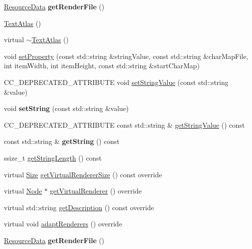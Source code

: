 \begin{DoxyCompactItemize}
\item 
\mbox{\label{classui_1_1TextAtlas_ad62a4335155276f3e2dc795180cff3d1}} 
\hyperlink{structResourceData}{Resource\+Data} {\bfseries get\+Render\+File} ()
\item 
\hyperlink{classui_1_1TextAtlas_a10e8abf999ff03704e3d8ba2f44487d2}{Text\+Atlas} ()
\item 
virtual \hyperlink{classui_1_1TextAtlas_a09278347c272a0c38b95f4a48cc35817}{$\sim$\+Text\+Atlas} ()
\item 
void \hyperlink{classui_1_1TextAtlas_a7d6ab98bd8279a893f304205964401dd}{set\+Property} (const std\+::string \&string\+Value, const std\+::string \&char\+Map\+File, int item\+Width, int item\+Height, const std\+::string \&start\+Char\+Map)
\item 
C\+C\+\_\+\+D\+E\+P\+R\+E\+C\+A\+T\+E\+D\+\_\+\+A\+T\+T\+R\+I\+B\+U\+TE void \hyperlink{classui_1_1TextAtlas_af0f33051246221a59b0127462f5b9ab4}{set\+String\+Value} (const std\+::string \&value)
\item 
\mbox{\label{classui_1_1TextAtlas_a80b1969ff0cc993876021ef4f3f98b68}} 
void {\bfseries set\+String} (const std\+::string \&value)
\item 
C\+C\+\_\+\+D\+E\+P\+R\+E\+C\+A\+T\+E\+D\+\_\+\+A\+T\+T\+R\+I\+B\+U\+TE const std\+::string \& \hyperlink{classui_1_1TextAtlas_a02a1ddc7ce3e45c8591d051e6f1471c6}{get\+String\+Value} () const
\item 
\mbox{\label{classui_1_1TextAtlas_ae793e0eacc4ee130df86dfa700ebc657}} 
const std\+::string \& {\bfseries get\+String} () const
\item 
ssize\+\_\+t \hyperlink{classui_1_1TextAtlas_abb16bab18d7e725fd0be9662a76d7e41}{get\+String\+Length} () const
\item 
virtual \hyperlink{classSize}{Size} \hyperlink{classui_1_1TextAtlas_a844dc4093d63a8ec2d4b6feac6247325}{get\+Virtual\+Renderer\+Size} () const override
\item 
virtual \hyperlink{classNode}{Node} $\ast$ \hyperlink{classui_1_1TextAtlas_ad507ef83a1b5570819a24afe337d2835}{get\+Virtual\+Renderer} () override
\item 
virtual std\+::string \hyperlink{classui_1_1TextAtlas_a36a90d51e86387430b57c57fea9d5f4b}{get\+Description} () const override
\item 
virtual void \hyperlink{classui_1_1TextAtlas_ad77f295e4f6fe205cf0da0da9330097b}{adapt\+Renderers} () override
\item 
\mbox{\label{classui_1_1TextAtlas_ad62a4335155276f3e2dc795180cff3d1}} 
\hyperlink{structResourceData}{Resource\+Data} {\bfseries get\+Render\+File} ()
\end{DoxyCompactItemize}
